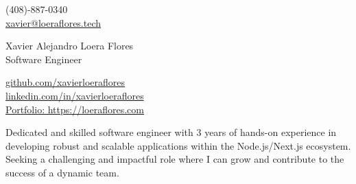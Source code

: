 \documentclass[a4,10pt]{article}
\begin{document}
\begin{center}
    \begin{minipage}[b]{0.29\textwidth}
            (408)-887-0340 \\
            \href{mailto:xavier@loeraflores.tech}{xavier@loeraflores.tech} 
    \end{minipage}%
    \begin{minipage}[b]{0.4\textwidth}
            \centering
            {\Large Xavier Alejandro Loera Flores} \\ %
            \vspace{0.1cm}
            {\color{UI_blue} \Large{Software Engineer}} \\
    \end{minipage}%
    \begin{minipage}[b]{0.29\textwidth}
            \flushright  %
            {\href{https://github.com/xavierloeraflores}{github.com/xavierloeraflores} } \\
            {\href{https://www.linkedin.com/in/xavierloeraflores}{linkedin.com/in/xavierloeraflores} } \\
            \href{https://loeraflores.com}{Portfolio: https://loeraflores.com}
    \end{minipage}   
    
\vspace{-0.15cm} 
{\color{UI_blue} \hrulefill}
\end{center}
\vspace{-0.25cm}

{Dedicated and skilled software engineer with 3 years of hands-on experience in developing robust and scalable applications within the Node.js/Next.js ecosystem. Seeking a challenging and impactful role where I can grow and contribute to the success of a dynamic team.}
\vspace{-0.4cm}

\end{document}

